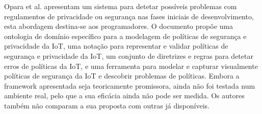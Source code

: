 \documentclass[conference]{IEEEtran}
\begin{document}

Opara et al. \cite{opara2022framework} apresentam um sistema para detetar
possíveis problemas com regulamentos de privacidade ou segurança nas fases
iniciais de desenvolvimento, esta abordagem destina-se aos programadores. O
documento propõe uma ontologia de domínio específico para a modelagem de políticas
de segurança e privacidade da IoT, uma notação para representar e validar políticas
de segurança e privacidade da IoT, um conjunto de diretrizes e regras para
detetar erros de políticas da IoT, e uma ferramenta para modelar e capturar
visualmente políticas de segurança da IoT e descobrir problemas de políticas.
Embora a framework apresentada seja teoricamente promissora, ainda não foi
testada num ambiente real, pelo que a sua eficácia ainda não pode ser medida.
Os autores também não comparam a sua proposta com outras já disponíveis.

\end{document}
